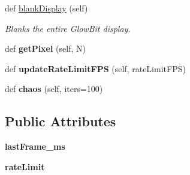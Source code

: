 \begin{DoxyCompactItemize}
def \hyperlink{classglowbit_1_1glowbit_ad3ace3e4d58bc9dadf62c1306aff2464}{blank\+Display} (self)
\begin{DoxyCompactList}\small\item\em Blanks the entire Glow\+Bit display. \end{DoxyCompactList}\item 
\mbox{\label{classglowbit_1_1glowbit_a0f15a8907f807ed1af905854fedbbc60}} 
def {\bfseries get\+Pixel} (self, N)
\item 
\mbox{\label{classglowbit_1_1glowbit_a7f72cb0878a688aa6181d4632428da09}} 
def {\bfseries update\+Rate\+Limit\+F\+PS} (self, rate\+Limit\+F\+PS)
\item 
\mbox{\label{classglowbit_1_1glowbit_ae95bb7e0ee556e02d918f376cffcb9ce}} 
def {\bfseries chaos} (self, iters=100)
\end{DoxyCompactItemize}
\subsection*{Public Attributes}
\begin{DoxyCompactItemize}
\item 
\mbox{\label{classglowbit_1_1glowbit_a5f14ddb9b3ec9a848c050b28d27ced9e}} 
{\bfseries last\+Frame\+\_\+ms}
\item 
\mbox{\label{classglowbit_1_1glowbit_a69bf20e5a054c0cf8656986b07048851}} 
{\bfseries rate\+Limit}
\end{DoxyCompactItemize}
